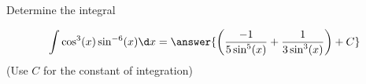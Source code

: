 \documentclass{ximera}
\author{Jason Miller}
\begin{document}
\begin{exercise}
Determine the integral

\[
\int \cos^{3}(x)\sin^{-6}(x) \d x= \answer{ \left(    \frac{-1}{5\sin^{5}(x)} + \frac{1}{3 \sin^{3}(x)}  \right) +C} 
\]
(Use $C$ for the constant of integration)

\end{exercise}
\end{document}
